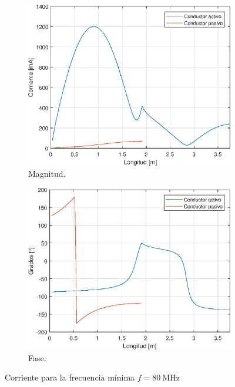 \begin{figure}[H]
\begin{subfigure}{0.5\textwidth}
		\includegraphics[scale=0.6]{imagenes/i_mag_80_tierra.eps}
		\caption{Magnitud.}
		\label{fig.i_mag_80_tierra}
	\end{subfigure}
	\quad
	\begin{subfigure}{0.5\textwidth}
		\includegraphics[scale=0.6]{imagenes/i_fase_80_tierra.eps}
		\caption{Fase.}
		\label{fig.i_fase_80_tierra}
	\end{subfigure}
	\caption{Corriente para la frecuencia mínima $f = \SI{80}{\mega\hertz}$}
\end{figure}

